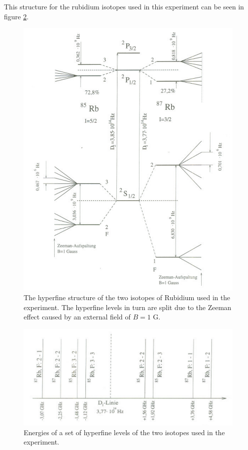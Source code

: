 This structure for the rubidium isotopes used in this experiment can be seen in figure \ref{fig:hfslevels}.\\

\begin{figure}[H]
\centering
\includegraphics[width=1.0\linewidth]{graphics/hyperfinestructure}
\caption[Hyperfine structure of Rubidium]{The hyperfine structure of the two isotopes of Rubidium used in the experiment. The hyperfine levels in turn are split due to the Zeeman effect caused by an external field of $B=1$ G. \cite{staatsex}}
\label{fig:hyperfinestructure}
\end{figure}

\begin{figure}[H]
\centering
\includegraphics[width=1.0\linewidth]{graphics/hfslevels}
\caption[Hyperfine structure energies]{Energies of a set of hyperfine levels of the two isotopes used in the experiment. \cite{staatsex}}
\label{fig:hfslevels}
\end{figure}

